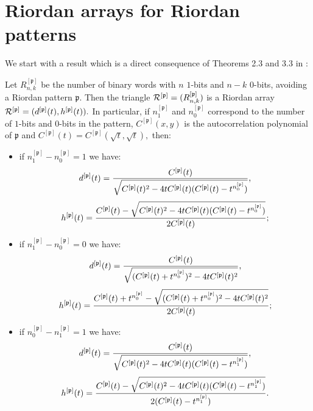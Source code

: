\section{Riordan arrays for Riordan patterns}

We start with a result which is a direct consequence of  Theorems 2.3 and 3.3
in \citep{MERLINI20112988}:
\begin{theorem}
\label{teo1}
Let  $R_{n,k}^{[\mathfrak{p}]}$ be the number of binary words with $n$ $1$-bits
and $n-k$  $0$-bits, avoiding a Riordan pattern $\mathfrak{p}.$  Then the
triangle ${\cal{R}^{[\mathfrak{p}]}}=(R_{n, k}^{[\mathfrak{p}]})$ is a Riordan
array
${\cal{R}^{[\mathfrak{p}]}}=(d^{[\mathfrak{p}]}(t),h^{[\mathfrak{p}]}(t)).$ In
particular, if  $n_1^{[\mathfrak{p}]}$ and  $n_0^{[\mathfrak{p}]}$ correspond
to the number of $1$-bits  and  $0$-bits in the pattern, $C^{[\mathfrak{p}]}(x,y)$ is
the autocorrelation polynomial of $\mathfrak{p}$ and
$C^{[\mathfrak{p}]}(t)=C^{[\mathfrak{p}]}(\sqrt{t},\sqrt{t}),$ then:
\begin{itemize}

\item if $n_1^{[\mathfrak{p}]}-n_0^{[\mathfrak{p}]}=1$ we have:
$$d^{[\mathfrak{p}]}(t)={C^{[\mathfrak{p}]}(t)
\over \sqrt{C^{[\mathfrak{p}]}(t)^2-4tC^{[\mathfrak{p}]}(t)(C^{[\mathfrak{p}]}(t)-t^{n_0^{[\mathfrak{p}]}})}}, $$
$$h^{[\mathfrak{p}]}(t)={C^{[\mathfrak{p}]}(t) -\sqrt{C^{[\mathfrak{p}]}(t)^2-4tC^{[\mathfrak{p}]}(t)(C^{[\mathfrak{p}]}(t)-t^{n_0^{[\mathfrak{p}]}})}
\over 2 C^{[\mathfrak{p}]}(t)};$$

\item if $n_1^{[\mathfrak{p}]}-n_0^{[\mathfrak{p}]}=0$ we have:
$$d^{[\mathfrak{p}]}(t)={C^{[\mathfrak{p}]}(t)
\over \sqrt{( C^{[\mathfrak{p}]}(t)+t^{n_0^{[\mathfrak{p}]}})^2-4tC^{[\mathfrak{p}]}(t)^2}},$$
$$h^{[\mathfrak{p}]}(t)=
{C^{[\mathfrak{p}]}(t)+ t^{n_0^{[\mathfrak{p}]}} - \sqrt{( C^{[\mathfrak{p}]}(t)+t^{n_0^{[\mathfrak{p}]}})^2-4tC^{[\mathfrak{p}]}(t)^2}
\over 2 C^{[\mathfrak{p}]}(t)};$$

\item if $n_0^{[\mathfrak{p}]}-n_1^{[\mathfrak{p}]}=1$ we have:
$$d^{[\mathfrak{p}]}(t)={C^{[\mathfrak{p}]}(t)
\over \sqrt{C^{[\mathfrak{p}]}(t)^2-4tC^{[\mathfrak{p}]}(t)(C^{[\mathfrak{p}]}(t)-t^{n_1^{[\mathfrak{p}]}})}},$$
$$h^{[\mathfrak{p}]}(t)={C^{[\mathfrak{p}]}(t) -\sqrt{C^{[\mathfrak{p}]}(t)^2-4tC^{[\mathfrak{p}]}(t)(C^{[\mathfrak{p}]}(t)-t^{n_1^{[\mathfrak{p}]}})}
\over 2 (C^{[\mathfrak{p}]}(t)- t^{n_1^{[\mathfrak{p}]}})}.$$

\end{itemize}
\end{theorem}


